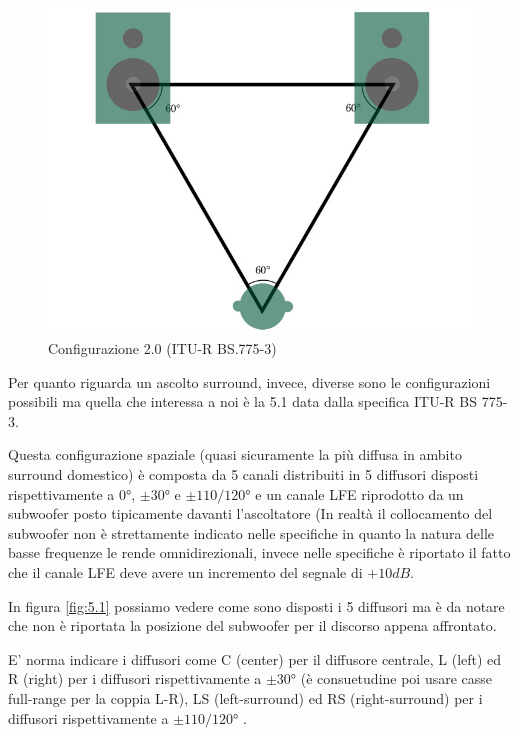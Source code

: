 \documentclass[12pt,a4paper]{report}
\begin{document}
\begin{figure}[htbp]
	\centering
	\includegraphics[scale=0.30]{figures/2-0.jpg}
	\caption {Configurazione 2.0 (ITU-R BS.775-3)}
	\label{fig:2.0}
	\end{figure}
	
Per quanto riguarda un ascolto surround, invece, diverse sono le configurazioni possibili ma quella che interessa a noi è la 5.1 data dalla specifica ITU-R BS 775-3\cite{5.1}.

Questa configurazione spaziale (quasi sicuramente la più diffusa in ambito surround domestico) è composta da 5 canali distribuiti in 5 diffusori disposti rispettivamente a $0°$, $\pm30°$ e $\pm110/120°$ e un canale LFE riprodotto da un subwoofer posto tipicamente davanti l'ascoltatore (In realtà il collocamento del subwoofer non è strettamente indicato nelle specifiche in quanto la natura delle basse frequenze le rende omnidirezionali, invece nelle specifiche è riportato il fatto che il canale LFE deve avere un incremento del segnale di $+10dB$.

In figura \ref{fig:5.1} possiamo vedere come sono disposti i 5 diffusori ma è da notare che non è riportata la posizione del subwoofer per il discorso appena affrontato.

E' norma indicare i diffusori come C (center) per il diffusore centrale, L (left) ed R (right) per i diffusori rispettivamente a $\pm30°$ (è consuetudine poi usare casse full-range per la coppia L-R), LS (left-surround) ed RS (right-surround) per i diffusori rispettivamente a $\pm110/120°$ .
\end{document}
